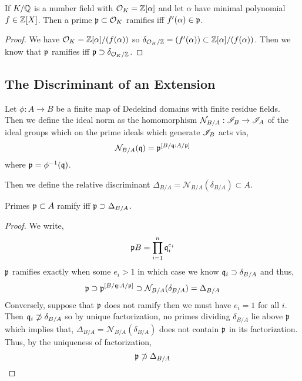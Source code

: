 \documentclass[12pt]{article}
\begin{document}
\begin{corollary}
If $K / \mathbb{Q}$ is a number field with $\mathcal{O}_{K} = \mathbb{Z}[\alpha]$ and let $\alpha$ have minimal polynomial $f \in \mathbb{Z}[X]$. Then a prime $\mathfrak{p} \subset \mathcal{O}_{K}$ ramifies iff $f'(\alpha) \in \mathfrak{p}$. 
\end{corollary}

\begin{proof}
We have $\mathcal{O}_{K} = \mathbb{Z}[\alpha]/(f(\alpha))$ so $\delta_{\mathcal{O}_{K}/\mathbb{Z}} = (f'(\alpha)) \subset \mathbb{Z}[\alpha]/(f(\alpha))$. Then we know that $\mathfrak{p}$ ramifies iff $\mathfrak{p} \supset \delta_{\mathcal{O}_{K}/\mathbb{Z}}$. 
\end{proof}

\subsection{The Discriminant of an Extension}

\newcommand{\Norm}{\mathcal{N}}

\begin{definition}
Let $\phi : A \to B$ be a finite map of Dedekind domains with finite residue fields. Then we define the ideal norm as the homomorphism $\Norm_{B/A} : \I_{B} \to \I_{A}$ of the ideal groups which on the prime ideals which generate $\mathscr{I}_B$ acts via,
\[ \Norm_{B / A}(\q) = \p^{[B / \q : A / \p]} \]
where $\mathfrak{p} = \phi^{-1}(\mathfrak{q})$. 
\end{definition}


\begin{definition}
Then we define the relative discriminant $\Delta_{B/A} = \Norm_{B/A}(\delta_{B/A}) \subset A$.
\end{definition}

\begin{proposition}
Primes $\mathfrak{p} \subset A$ ramify iff $\mathfrak{p} \supset \Delta_{B / A}$. 
\end{proposition}

\begin{proof}
We write,
\[ \mathfrak{p} B = \prod_{i = 1}^n \mathfrak{q}_i^{e_i} \]
$\mathfrak{p}$ ramifies exactly when some $e_i > 1$ in which case we know $\mathfrak{q}_i \supset \delta_{B/A}$ and thus,
\[ \p \supset \p^{[B / \q : A / \p]} \supset \Norm_{B / A}(\delta_{B/A}) = \Delta_{B/A} \]
Conversely, suppose that $\mathfrak{p}$ does not ramify then we must have $e_i = 1$ for all $i$. Then $\mathfrak{q}_i \not\supset \delta_{B/A}$ so by unique factorization, no primes dividing $\delta_{B/A}$ lie above $\mathfrak{p}$ which implies that, $\Delta_{B/A} = \Norm_{B/A}(\delta_{B/A})$ does not contain $\mathfrak{p}$ in its factorization. Thus, by the uniqueness of factorization,
\[ \mathfrak{p} \not\supset \Delta_{B/A} \]
\end{proof}
\end{document}

